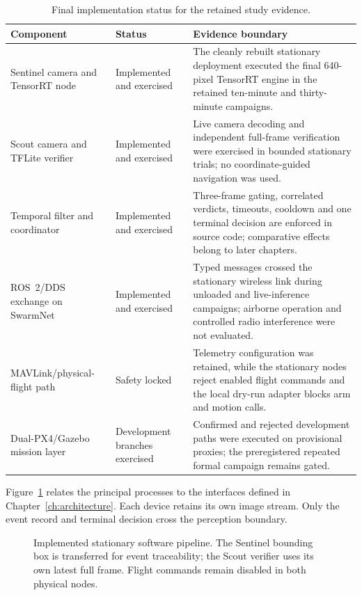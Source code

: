\begin{table}[H]
  \centering
  \caption{Final implementation status for the retained study evidence.}
  \label{tab:implementation-status}
  \small
  \begin{tabularx}{\textwidth}{@{}>{\raggedright\arraybackslash}p{}>{\raggedright\arraybackslash}p{}>{\raggedright\arraybackslash}X@{}}
    \toprule
    Component & Status & Evidence boundary \\
    \midrule
    Sentinel camera and TensorRT node & Implemented and exercised &
    The cleanly rebuilt stationary deployment executed the final 640-pixel
    TensorRT engine in the retained ten-minute and thirty-minute campaigns. \\
    Scout camera and TFLite verifier & Implemented and exercised &
    Live camera decoding and independent full-frame verification were exercised
    in bounded stationary trials; no coordinate-guided navigation was used. \\
    Temporal filter and coordinator & Implemented and exercised & Three-frame
    gating, correlated verdicts, timeouts, cooldown and one terminal decision
    are enforced in source code; comparative effects belong to later chapters. \\
    ROS~2/DDS exchange on SwarmNet & Implemented and exercised & Typed messages
    crossed the stationary wireless link during unloaded and live-inference
    campaigns; airborne operation and controlled radio interference were not
    evaluated. \\
    MAVLink/physical-flight path & Safety locked & Telemetry configuration was
    retained, while the stationary nodes reject enabled flight commands and the
    local dry-run adapter blocks arm and motion calls. \\
    Dual-PX4/Gazebo mission layer & Development branches exercised & Confirmed
    and rejected development paths were executed on provisional proxies; the
    preregistered repeated formal campaign remains gated. \\
    \bottomrule
  \end{tabularx}
\end{table}

Figure~\ref{fig:implementation-pipeline} relates the principal processes to the
interfaces defined in Chapter~\ref{ch:architecture}. Each device retains its
own image stream. Only the event record and terminal decision cross the
perception boundary.

\begin{figure}[H]
  \centering
  \resizebox{0.98\textwidth}{!}{}
  \caption{Implemented stationary software pipeline. The Sentinel bounding box
  is transferred for event traceability; the Scout verifier uses its own latest
  full frame. Flight commands remain disabled in both physical nodes.}
  \label{fig:implementation-pipeline}
\end{figure}

